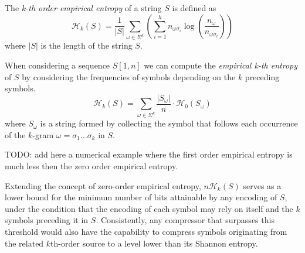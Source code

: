 \begin{definition} \label{def:kth_order_empirical_entropy}
    The \emph{k-th order empirical entropy} of a string $S$ is defined as
    \begin{equation}
        \mathcal{H}_k(S) = \frac{1}{|S|} \sum_{\omega \in \Sigma^k} \left ( \sum_{i=1}^h n_{\omega\sigma_i} \log \left ( \frac{n_\omega}{n_{\omega\sigma_i}} \right) \right )
    \end{equation}
    where $|S|$ is the length of the string $S$.
\end{definition}

\noindent When considering a sequence $S[1,n]$ we can compute the \emph{empirical k-th entropy} of $S$ by considering the frequencies of symbols depending on the $k$ preceding symbols.
\begin{equation}
    \mathcal{H}_k(S) = \sum_{\omega \in \Sigma^k} \frac{|S_\omega|}{n} \cdot \mathcal{H_0}(S_\omega)
\end{equation}
where $S_\omega$ is a string formed by collecting the symbol that follows each occurrence of the $k$-gram $\omega = \sigma_1 \dots \sigma_k$ in $S$.

\begin{example}
    TODO: add here a numerical example where the first order empirical entropy is much less then the zero order empirical entropy.
\end{example}

\noindent Extending the concept of zero-order empirical entropy, $n \mathcal{H}_k(S)$ serves as a lower bound for the minimum number of bits attainable by any encoding of $S$, under the condition that the encoding of each symbol may rely on itself and the $k$ symbols preceding it in $S$. Consistently, any compressor that surpasses this threshold would also have the capability to compress symbols originating from the related $k$th-order source to a level lower than its Shannon entropy.

